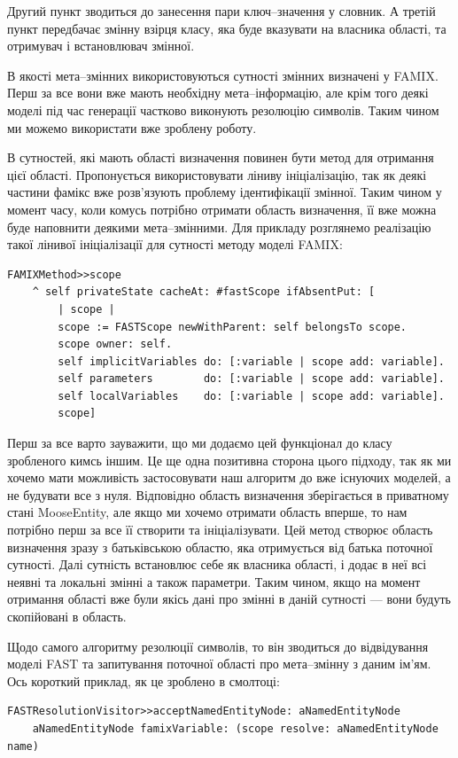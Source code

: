 \documentclass[12pt,a4paper]{article}
\begin{document}
Другий пункт зводиться до занесення пари ключ--значення у словник. А третій пункт передбачає змінну взірця класу, яка буде вказувати на власника області, та отримувач і встановлювач змінної.

В якості мета--змінних використовуються сутності змінних визначені у FAMIX. Перш за все вони вже мають необхідну мета--інформацію, але крім того деякі моделі під час генерації частково виконують резолюцію символів. Таким чином ми можемо використати вже зроблену роботу.

В сутностей, які мають області визначення повинен бути метод для отримання цієї області. Пропонується використовувати ліниву ініціалізацію, так як деякі частини фамікс вже розв'язують проблему ідентифікації змінної. Таким чином у момент часу, коли комусь потрібно отримати область визначення, її вже можна буде наповнити деякими мета--змінними. Для прикладу розглянемо реалізацію такої лінивої ініціалізації для сутності методу моделі FAMIX:
\begin{lstlisting}[language=Smalltalk]
FAMIXMethod>>scope
	^ self privateState cacheAt: #fastScope ifAbsentPut: [
		| scope |
		scope := FASTScope newWithParent: self belongsTo scope.
		scope owner: self.
		self implicitVariables do: [:variable | scope add: variable].
		self parameters        do: [:variable | scope add: variable].
		self localVariables    do: [:variable | scope add: variable].
		scope]
\end{lstlisting}

Перш за все варто зауважити, що ми додаємо цей функціонал до класу зробленого кимсь іншим. Це ще одна позитивна сторона цього підходу, так як ми хочемо мати можливість застосовувати наш алгоритм до вже існуючих моделей, а не будувати все з нуля. Відповідно область визначення зберігається в приватному стані MooseEntity, але якщо ми хочемо отримати область вперше, то нам потрібно перш за все її створити та ініціалізувати. Цей метод створює область визначення зразу з батьківською областю, яка отримується від батька поточної сутності. Далі сутність встановлює себе як власника області, і додає в неї всі неявні та локальні змінні а також параметри. Таким чином, якщо на момент отримання області вже були якісь дані про змінні в даній сутності --- вони будуть скопійовані в область.

Щодо самого алгоритму резолюції символів, то він зводиться до відвідування моделі FAST та запитування поточної області про мета--змінну з даним ім'ям. Ось короткий приклад, як це зроблено в смолтоці:
\begin{lstlisting}[language=Smalltalk]
FASTResolutionVisitor>>acceptNamedEntityNode: aNamedEntityNode
	aNamedEntityNode famixVariable: (scope resolve: aNamedEntityNode name)
\end{lstlisting}
\end{document}
